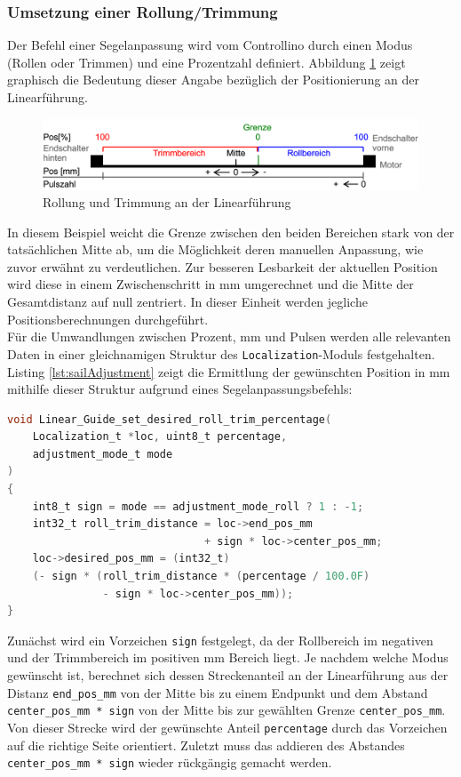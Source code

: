 \subsubsection{Umsetzung einer Rollung/Trimmung}
Der Befehl einer Segelanpassung wird vom Controllino durch einen Modus (Rollen oder Trimmen) und eine Prozentzahl definiert. Abbildung \ref{fig:linearGuide} zeigt graphisch die Bedeutung dieser Angabe bezüglich der Positionierung an der Linearführung.
\begin{figure}[H]
	\centering
	\includegraphics[width=\linewidth]{images/Software/LinearGuide.png}
	\caption{Rollung und Trimmung an der Linearführung}
	\label{fig:linearGuide}
\end{figure}
\noindent
In diesem Beispiel weicht die Grenze zwischen den beiden Bereichen stark von der tatsächlichen Mitte ab, um die Möglichkeit deren manuellen Anpassung, wie zuvor erwähnt zu verdeutlichen. Zur besseren Lesbarkeit der aktuellen Position wird diese in einem Zwischenschritt in mm umgerechnet und die Mitte der Gesamtdistanz auf null zentriert. In dieser Einheit werden jegliche Positionsberechnungen durchgeführt. \\

\noindent
Für die Umwandlungen zwischen Prozent, mm und Pulsen werden alle relevanten Daten in einer gleichnamigen Struktur des \verb|Localization|-Moduls festgehalten. Listing \ref{lst:sailAdjustment} zeigt die Ermittlung der gewünschten Position in mm mithilfe dieser Struktur aufgrund eines Segelanpassungsbefehls:
\begin{lstlisting}[language=C, caption={Berechnung der Zielposition}, label={lst:sailAdjustment}]
void Linear_Guide_set_desired_roll_trim_percentage(
	Localization_t *loc, uint8_t percentage, 
	adjustment_mode_t mode
)
{
	int8_t sign = mode == adjustment_mode_roll ? 1 : -1;
	int32_t roll_trim_distance = loc->end_pos_mm
	                           + sign * loc->center_pos_mm;
	loc->desired_pos_mm = (int32_t) 
	(- sign * (roll_trim_distance * (percentage / 100.0F)
	           - sign * loc->center_pos_mm));
}
\end{lstlisting}
Zunächst wird ein Vorzeichen \verb|sign| festgelegt, da der Rollbereich im negativen und der Trimmbereich im positiven mm Bereich liegt. Je nachdem welche Modus gewünscht ist, berechnet sich dessen Streckenanteil an der Linearführung aus der Distanz \verb|end_pos_mm| von der Mitte bis zu einem Endpunkt und dem Abstand \verb|center_pos_mm * sign| von der Mitte bis zur gewählten Grenze \verb|center_pos_mm|. Von dieser Strecke wird der gewünschte Anteil \verb|percentage| durch das Vorzeichen auf die richtige Seite orientiert. Zuletzt muss das addieren des Abstandes \verb|center_pos_mm * sign| wieder rückgängig gemacht werden.\\

